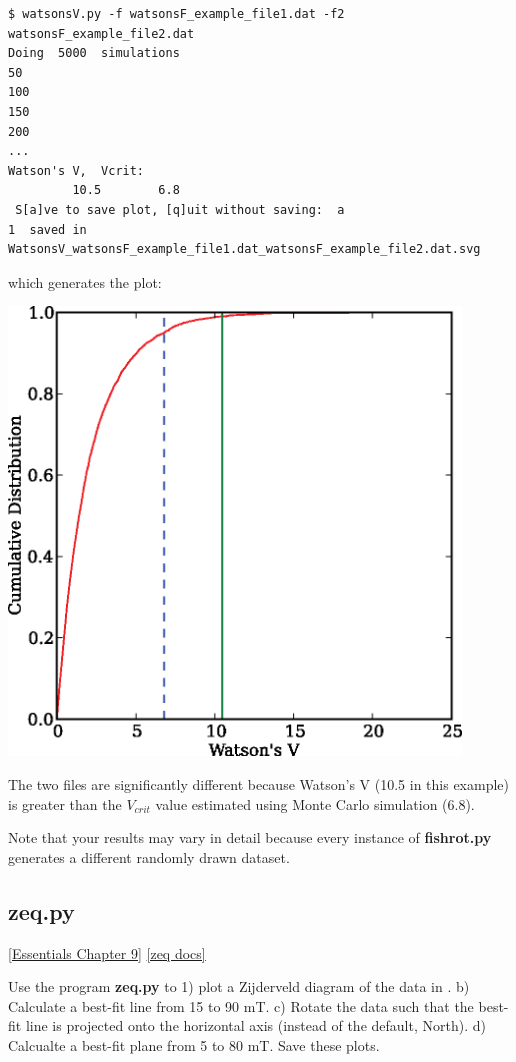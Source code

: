 \documentclass[11pt]{book}
\begin{document}
{\begin{verbatim}
$ watsonsV.py -f watsonsF_example_file1.dat -f2 watsonsF_example_file2.dat
Doing  5000  simulations
50
100
150
200
...
Watson's V,  Vcrit:
         10.5        6.8
 S[a]ve to save plot, [q]uit without saving:  a
1  saved in  WatsonsV_watsonsF_example_file1.dat_watsonsF_example_file2.dat.svg
       \end{verbatim}

\noindent  which generates the plot:


\includegraphics[width=12cm]{EPSfiles/watsonsV_example.eps}

 The two files are significantly different because Watson's V (10.5 in this example) is greater than the $V_{crit}$ value estimated using Monte Carlo simulation (6.8).

 Note that your results may vary in detail because every instance of {\bf fishrot.py}  generates  a different randomly drawn dataset.

%
\subsection{zeq.py}
\href{http://earthref.org/MAGIC/books/Tauxe/Essentials/WebBook3ch9.html#ch9}{[Essentials Chapter 9]}
\href{https://github.com/PmagPy/PmagPy/blob/master/programs/zeq.py}{[zeq docs]}

Use the program {\bf zeq.py} to 1) plot a Zijderveld diagram of the data in .  b) Calculate a best-fit line from 15 to 90 mT.  c) Rotate the data such that the best-fit line is projected onto the horizontal axis (instead of the default, North).   d) Calcualte a best-fit plane from 5 to 80 mT.  Save these plots.


}
\end{document}
